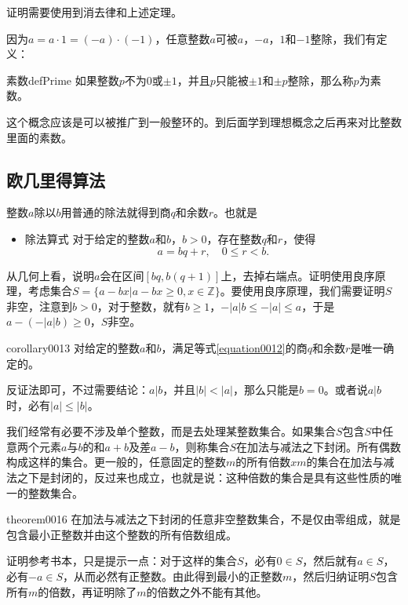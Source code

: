 证明需要使用到消去律和上述定理。

因为$a=a \cdot 1 = (-a) \cdot (-1)$，任意整数$a$可被$a$，$-a$，$1$和$-1$整除，我们有定义：
\begin{definition}{素数}{defPrime}
如果整数$p$不为0或$\pm{}1$，并且$p$只能被$\pm{}1$和$\pm{}p$整除，那么称$p$为素数。
\end{definition}
这个概念应该是可以被推广到一般整环的。到后面学到理想概念之后再来对比整数里面的素数。

\subsection{欧几里得算法}
整数$a$除以$b$用普通的除法就得到商$q$和余数$r$。也就是
\begin{itemize}
\item \textcolor{main}{除法算式} 对于给定的整数$a$和$b$，$b>0$，存在整数$q$和$r$，使得
\begin{equation}\label{equation0012}
a = bq + r, \quad 0 \le r < b.
\end{equation}
\end{itemize}

从几何上看，说明$a$会在区间$[bq, b(q+1)]$上，去掉右端点。证明使用良序原理，考虑集合$S = \{a-bx|a-bx \ge 0, x \in \mathbb{Z}\}$。要使用良序原理，我们需要证明$S$非空，注意到$b>0$，对于整数，就有$b \ge 1$，$-|a|b \le -|a| \le a$，于是$a - (-|a|b) \ge 0$，$S$非空。

\begin{corollary}{}{corollary0013}
对给定的整数$a$和$b$，满足等式\ref{equation0012}的商$q$和余数$r$是唯一确定的。
\end{corollary}

反证法即可，不过需要结论：$a|b$，并且$|b| < |a|$，那么只能是$b = 0$。或者说$a|b$时，必有$|a| \le |b|$。

我们经常有必要不涉及单个整数，而是去处理某整数集合。如果集合$S$包含$S$中任意两个元素$a$与$b$的和$a+b$及差$a-b$，则称集合$S$在加法与减法之下封闭。所有偶数构成这样的集合。更一般的，任意固定的整数$m$的所有倍数$xm$的集合在加法与减法之下是封闭的，反过来也成立，也就是说：这种倍数的集合是具有这些性质的唯一的整数集合。
\begin{theorem}{}{theorem0016}
在加法与减法之下封闭的任意非空整数集合，不是仅由零组成，就是包含最小正整数并由这个整数的所有倍数组成。
\end{theorem}

证明参考书本，只是提示一点：对于这样的集合$S$，必有$0 \in S$，然后就有$a \in S$，必有$-a \in S$，从而必然有正整数。由此得到最小的正整数$m$，然后归纳证明$S$包含所有$m$的倍数，再证明除了$m$的倍数之外不能有其他。

